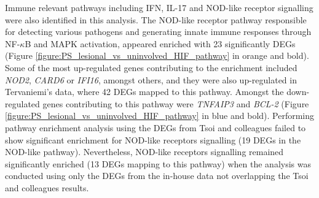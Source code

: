 Immune relevant pathways including IFN, IL-17 and NOD-like receptor signalling were also identified in this analysis. The NOD-like receptor pathway responsible for detecting various pathogens and generating innate immune responses through NF-$\kappa$B and MAPK activation, appeared enriched with 23 significantly DEGs (Figure \ref{figure:PS_lesional_vs_uninvolved_HIF_pathway} in orange and bold). %
Some of the most up-regulated genes contributing to the enrichment included \textit{NOD2}, \textit{CARD6} or \textit{IFI16}, amongst others, and they were also up-regulated in Tervaniemi's data, where 42 DEGs mapped to this pathway. Amongst the down-regulated genes contributing to this pathway were \textit{TNFAIP3} and \textit{BCL-2} (Figure \ref{figure:PS_lesional_vs_uninvolved_HIF_pathway} in blue and bold). Performing pathway enrichment analysis using the DEGs from Tsoi and colleagues failed to show significant enrichment for NOD-like receptors signalling (19 DEGs in the NOD-like pathway). Nevertheless, NOD-like receptors signalling remained significantly enriched (13 DEGs mapping to this pathway) when the analysis was conducted using only the DEGs from the in-house data not overlapping the Tsoi and colleagues results. 


